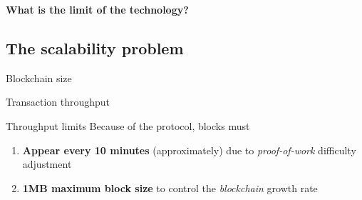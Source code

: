 \documentclass{beamer}
\begin{document}
\begin{frame}
 \begin{center}
  \textbf{What is the limit of the technology?}
 \end{center}
\end{frame}
\subsection{The scalability problem}
\begin{frame}{Blockchain size}
\end{frame}
\begin{frame}{Transaction throughput}
 \begin{block}{Throughput limits}
  Because of the protocol, blocks must
  \pause
  \begin{enumerate}[<+->]
   \item \textbf{Appear every 10 minutes} (approximately) due to \textit{proof-of-work} difficulty adjustment
   \item \textbf{1MB maximum block size} to control the \textit{blockchain} growth rate
  \end{enumerate}
 \end{block}
\end{frame}
\end{document}
